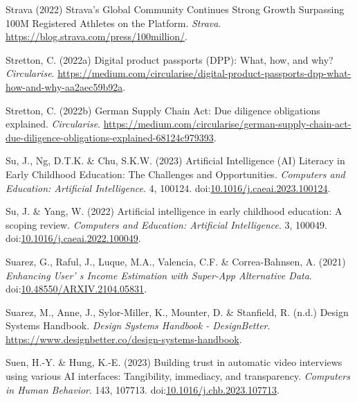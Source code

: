 \documentclass[
  letterpaper,
  DIV=11,
  numbers=noendperiod]{scrartcl}
\newlength{\cslhangindent}
\newenvironment{CSLReferences}[2] %
 {\begin{list}{}{%
  \setlength{\itemindent}{0pt}
  \setlength{\leftmargin}{0pt}
  \setlength{\parsep}{0pt}
  \ifodd #1
   \setlength{\leftmargin}{\cslhangindent}
   \setlength{\itemindent}{-1\cslhangindent}
  \fi
  \setlength{\itemsep}{#2\baselineskip}}}
 {\end{list}}
\begin{document}
\begin{CSLReferences}{0}{1}
Strava (2022) Strava's {Global Community Continues Strong Growth
Surpassing 100M Registered Athletes} on the {Platform}. \emph{Strava}.
\url{https://blog.strava.com/press/100million/}.

Stretton, C. (2022a) Digital product passports ({DPP}): What, how, and
why? \emph{Circularise}.
\url{https://medium.com/circularise/digital-product-passports-dpp-what-how-and-why-aa2aec59b92a}.

Stretton, C. (2022b) German {Supply Chain Act}: {Due} diligence
obligations explained. \emph{Circularise}.
\url{https://medium.com/circularise/german-supply-chain-act-due-diligence-obligations-explained-68124c979393}.

Su, J., Ng, D.T.K. \& Chu, S.K.W. (2023) Artificial {Intelligence}
({AI}) {Literacy} in {Early Childhood Education}: {The Challenges} and
{Opportunities}. \emph{Computers and Education: Artificial
Intelligence}. 4, 100124.
doi:\href{https://doi.org/10.1016/j.caeai.2023.100124}{10.1016/j.caeai.2023.100124}.

Su, J. \& Yang, W. (2022) Artificial intelligence in early childhood
education: {A} scoping review. \emph{Computers and Education: Artificial
Intelligence}. 3, 100049.
doi:\href{https://doi.org/10.1016/j.caeai.2022.100049}{10.1016/j.caeai.2022.100049}.

Suarez, G., Raful, J., Luque, M.A., Valencia, C.F. \& Correa-Bahnsen, A.
(2021) \emph{Enhancing {User}' s {Income Estimation} with {Super-App
Alternative Data}}.
doi:\href{https://doi.org/10.48550/ARXIV.2104.05831}{10.48550/ARXIV.2104.05831}.

Suarez, M., Anne, J., Sylor-Miller, K., Mounter, D. \& Stanfield, R.
(n.d.) Design {Systems Handbook}. \emph{Design Systems Handbook -
DesignBetter}.
\url{https://www.designbetter.co/design-systems-handbook}.

Suen, H.-Y. \& Hung, K.-E. (2023) Building trust in automatic video
interviews using various {AI} interfaces: {Tangibility}, immediacy, and
transparency. \emph{Computers in Human Behavior}. 143, 107713.
doi:\href{https://doi.org/10.1016/j.chb.2023.107713}{10.1016/j.chb.2023.107713}.


\end{CSLReferences}
\end{document}
